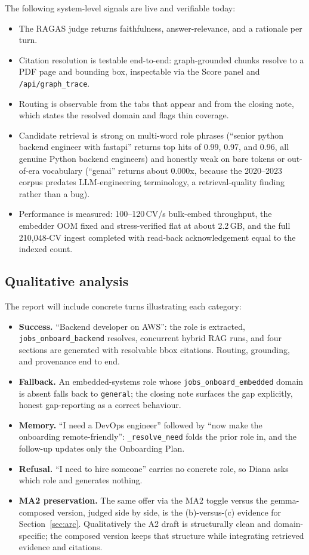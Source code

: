 The following system-level signals are live and verifiable today:

\begin{itemize}
  \item The RAGAS judge returns faithfulness, answer-relevance, and a rationale per turn.
  \item Citation resolution is testable end-to-end: graph-grounded chunks resolve to a PDF
    page and bounding box, inspectable via the Score panel and \verb|/api/graph_trace|.
  \item Routing is observable from the tabs that appear and from the closing note, which
    states the resolved domain and flags thin coverage.
  \item Candidate retrieval is strong on multi-word role phrases (``senior python backend
    engineer with fastapi'' returns top hits of 0.99, 0.97, and 0.96, all genuine Python
    backend engineers) and honestly weak on bare tokens or out-of-era vocabulary (``genai''
    returns about 0.000x, because the 2020--2023 corpus predates LLM-engineering
    terminology, a retrieval-quality finding rather than a bug).
  \item Performance is measured: 100--120\,CV/s bulk-embed throughput, the embedder OOM
    fixed and stress-verified flat at about 2.2\,GB, and the full 210,048-CV ingest
    completed with read-back acknowledgement equal to the indexed count.
\end{itemize}

\subsection{Qualitative analysis}

The report will include concrete turns illustrating each category:

\begin{itemize}
  \item \textbf{Success.} ``Backend developer on AWS'': the role is extracted,
    \verb|jobs_onboard_backend| resolves, concurrent hybrid RAG runs, and four sections are
    generated with resolvable bbox citations. Routing, grounding, and provenance end to
    end.
  \item \textbf{Fallback.} An embedded-systems role whose \verb|jobs_onboard_embedded|
    domain is absent falls back to \verb|general|; the closing note surfaces the gap
    explicitly, honest gap-reporting as a correct behaviour.
  \item \textbf{Memory.} ``I need a DevOps engineer'' followed by ``now make the onboarding
    remote-friendly'': \verb|_resolve_need| folds the prior role in, and the follow-up
    updates only the Onboarding Plan.
  \item \textbf{Refusal.} ``I need to hire someone'' carries no concrete role, so Diana asks
    which role and generates nothing.
  \item \textbf{MA2 preservation.} The same offer via the MA2 toggle versus the
    gemma-composed version, judged side by side, is the (b)-versus-(c) evidence for
    Section~\ref{sec:arc}. Qualitatively the A2 draft is structurally clean and
    domain-specific; the composed version keeps that structure while integrating retrieved
    evidence and citations.
\end{itemize}
